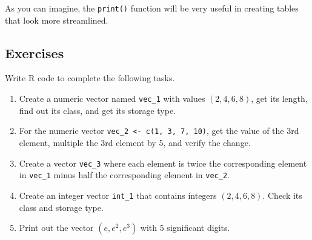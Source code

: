 \documentclass[
]{book}
\begin{document}
As you can imagine, the \texttt{print()} function will be very useful in creating tables that look more streamlined.

\hypertarget{exercises-5}{%
\subsection{Exercises}\label{exercises-5}}

Write R code to complete the following tasks.

\begin{enumerate}
\def\labelenumi{\arabic{enumi}.}
\item
  Create a numeric vector named \texttt{vec\_1} with values \((2, 4, 6, 8)\), get its length, find out its class, and get its storage type.
\item
  For the numeric vector \texttt{vec\_2\ \textless{}-\ c(1,\ 3,\ 7,\ 10)}, get the value of the 3rd element, multiple the 3rd element by 5, and verify the change.
\item
  Create a vector \texttt{vec\_3} where each element is twice the corresponding element in \texttt{vec\_1} minus half the corresponding element in \texttt{vec\_2}.
\item
  Create an integer vector \texttt{int\_1} that contains integers \((2, 4, 6, 8)\). Check its class and storage type.
\item
  Print out the vector \((e, e^2, e^3)\) with 5 significant digits.
\end{enumerate}

  
\end{document}

